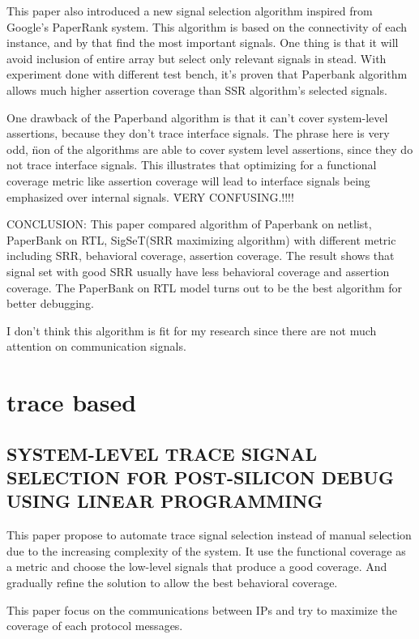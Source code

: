 \documentclass[conference]{IEEEtran}
\begin{document}
This paper also introduced a new signal selection algorithm inspired from Google's PaperRank system. This algorithm is based on the connectivity of each instance, and by that find the most important signals. One thing is that it will avoid inclusion of entire array but select only relevant signals in stead. With experiment done with different test bench, it's proven that Paperbank algorithm allows much higher assertion coverage than SSR algorithm's selected signals.

One drawback of the Paperband algorithm is that it can't cover system-level assertions, because they don't trace interface signals. The phrase here is very odd, \"non of the algorithms are able to cover system level assertions, since they do not trace interface signals. This illustrates that optimizing for a functional coverage metric like assertion coverage will lead to interface signals being emphasized over internal signals. \" 	VERY CONFUSING.!!!!

CONCLUSION: This paper compared algorithm of Paperbank on netlist, PaperBank on RTL, SigSeT(SRR maximizing algorithm) with different metric including SRR, behavioral coverage, assertion coverage. The result shows that signal set with good SRR usually have less behavioral coverage and assertion coverage. The PaperBank on RTL model turns out to be the best algorithm for better debugging. 

I don't think this algorithm is fit for my research since there are not much attention on communication signals. 



\section{trace based}
\subsection{SYSTEM-LEVEL TRACE SIGNAL SELECTION FOR POST-SILICON DEBUG USING LINEAR PROGRAMMING}
This paper propose to automate trace signal selection instead of manual selection due to the increasing complexity of the system. It use the functional coverage as a metric and choose the low-level signals that produce a good coverage. And gradually refine the solution to allow the best behavioral coverage. 

This paper focus on the communications between IPs and try to maximize the coverage of each protocol messages.
\end{document}
